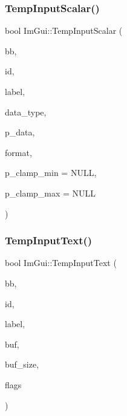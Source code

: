 \mbox{\label{namespaceImGui_a392fed3e7db2a75abf217bf84c6abce9}} 
\subsubsection{\texorpdfstring{Temp\+Input\+Scalar()}{TempInputScalar()}}
{\footnotesize\ttfamily bool Im\+Gui\+::\+Temp\+Input\+Scalar (\begin{DoxyParamCaption}\item[{const \hyperlink{structImRect}{Im\+Rect} \&}]{bb,  }\item[{Im\+Gui\+ID}]{id,  }\item[{const char $\ast$}]{label,  }\item[{Im\+Gui\+Data\+Type}]{data\+\_\+type,  }\item[{\hyperlink{imgui__impl__opengl3__loader_8h_ac668e7cffd9e2e9cfee428b9b2f34fa7}{void} $\ast$}]{p\+\_\+data,  }\item[{const char $\ast$}]{format,  }\item[{const \hyperlink{imgui__impl__opengl3__loader_8h_ac668e7cffd9e2e9cfee428b9b2f34fa7}{void} $\ast$}]{p\+\_\+clamp\+\_\+min = {\ttfamily NULL},  }\item[{const \hyperlink{imgui__impl__opengl3__loader_8h_ac668e7cffd9e2e9cfee428b9b2f34fa7}{void} $\ast$}]{p\+\_\+clamp\+\_\+max = {\ttfamily NULL} }\end{DoxyParamCaption})}

\mbox{\label{namespaceImGui_ae85def71d2fcf5409035b583b315964e}} 
\subsubsection{\texorpdfstring{Temp\+Input\+Text()}{TempInputText()}}
{\footnotesize\ttfamily bool Im\+Gui\+::\+Temp\+Input\+Text (\begin{DoxyParamCaption}\item[{const \hyperlink{structImRect}{Im\+Rect} \&}]{bb,  }\item[{Im\+Gui\+ID}]{id,  }\item[{const char $\ast$}]{label,  }\item[{char $\ast$}]{buf,  }\item[{int}]{buf\+\_\+size,  }\item[{Im\+Gui\+Input\+Text\+Flags}]{flags }\end{DoxyParamCaption})}

